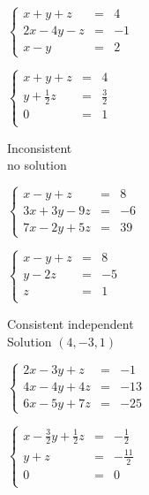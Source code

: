 \documentclass{ximera}
\begin{document}
\begin{question}
\begin{problem}
$\left\{ \begin{array}{rcr} x+y+z & = & 4 \\ 2x-4y-z& = & -1 \\ x-y & = & 2 \end{array} \right.$

\begin{solution}
$\left\{ \begin{array}{rcr} x+y+z & = & 4  \\ y + \frac{1}{2} z & = & \frac{3}{2} \\ 0 & = & 1 \\  \end{array} \right.$
 

Inconsistent\\
no solution
\end{solution}
\end{problem}

\begin{problem}
$\left\{ \begin{array}{rcr} x-y+z & = & 8 \\ 3x+3y-9z & = & -6 \\  7x-2y+5z & = & 39 \end{array} \right.$

\begin{solution}
$\left\{ \begin{array}{rcr} x-  y +  z & = & 8  \\ y -2z & = & -5 \\ z & = & 1 \\  \end{array} \right.$
 

Consistent independent\\
Solution $\left(4,-3,1\right)$
\end{solution}
\end{problem}

\begin{problem}
$\left\{ \begin{array}{rcr} 2x-3y+z & = & -1 \\ 4x-4y+4z & = & -13 \\ 6x-5y+7z & = & -25  \end{array} \right.$

\begin{solution}
$\left\{ \begin{array}{rcr} x- \frac{3}{2} y + \frac{1}{2} z & = & -\frac{1}{2}  \\  y +  z & = & -\frac{11}{2} \\ 0 & = & 0 \\  \end{array} \right.$
 


\end{solution}
\end{problem}
\end{question}
\end{document}
